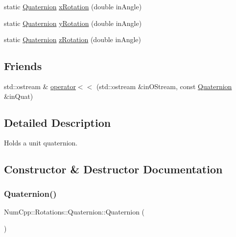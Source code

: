 \begin{DoxyCompactItemize}
\item 
static \mbox{\hyperlink{class_num_cpp_1_1_rotations_1_1_quaternion}{Quaternion}} \mbox{\hyperlink{class_num_cpp_1_1_rotations_1_1_quaternion_aa10a3ca29a4ac6c2f7854f47e4ca4bf9}{x\+Rotation}} (double in\+Angle)
\item 
static \mbox{\hyperlink{class_num_cpp_1_1_rotations_1_1_quaternion}{Quaternion}} \mbox{\hyperlink{class_num_cpp_1_1_rotations_1_1_quaternion_abcc4947abc9e0ca8dc2630940fad77df}{y\+Rotation}} (double in\+Angle)
\item 
static \mbox{\hyperlink{class_num_cpp_1_1_rotations_1_1_quaternion}{Quaternion}} \mbox{\hyperlink{class_num_cpp_1_1_rotations_1_1_quaternion_a1c696741a9ad04719a17f0afced00e0f}{z\+Rotation}} (double in\+Angle)
\end{DoxyCompactItemize}
\subsection*{Friends}
\begin{DoxyCompactItemize}
\item 
std\+::ostream \& \mbox{\hyperlink{class_num_cpp_1_1_rotations_1_1_quaternion_a6d11f3a719f010cdd220642d2bb586e6}{operator$<$$<$}} (std\+::ostream \&in\+O\+Stream, const \mbox{\hyperlink{class_num_cpp_1_1_rotations_1_1_quaternion}{Quaternion}} \&in\+Quat)
\end{DoxyCompactItemize}


\subsection{Detailed Description}
Holds a unit quaternion. 

\subsection{Constructor \& Destructor Documentation}
\mbox{\label{class_num_cpp_1_1_rotations_1_1_quaternion_a5bb8e5c47451ce53e0f556ded29b0b36}} 
\subsubsection{\texorpdfstring{Quaternion()}{Quaternion()}\hspace{0.1cm}{\footnotesize\ttfamily [1/3]}}
{\footnotesize\ttfamily Num\+Cpp\+::\+Rotations\+::\+Quaternion\+::\+Quaternion (\begin{DoxyParamCaption}{ }\end{DoxyParamCaption})\hspace{0.3cm}{\ttfamily [inline]}}

